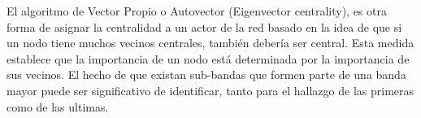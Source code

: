 El algoritmo  de Vector Propio o Autovector (Eigenvector centrality), es otra forma de asignar la centralidad a un actor de la red basado en la idea de que si un nodo tiene muchos vecinos centrales, también debería ser central. Esta medida establece que la importancia de un nodo está determinada por la importancia de sus vecinos. El hecho de que existan sub-bandas que formen parte de una banda mayor puede ser significativo de identificar, tanto para el hallazgo de las primeras como de las ultimas. 
 
